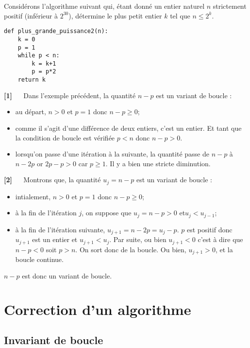 Considérons l’algorithme suivant qui, étant donné un entier naturel $n$ strictement positif (inférieur à $2^{30}$), détermine le plus petit entier $k$ tel que $n \leq 2^k$.
\begin{lstlisting}
def plus_grande_puissance2(n):
    k = 0
    p = 1
    while p < n:
        k = k+1
        p = p*2
    return k
\end{lstlisting}
\begin{demo}\textbf{[1]} $\quad$
Dans l’exemple précédent, la quantité $n - p$ est un variant de boucle :
\begin{itemize}
\item au départ, $n > 0$ et $p = 1$ donc $n - p \geq 0$;
\item comme il s’agit d’une différence de deux entiers, c’est un entier. Et tant que la condition
de boucle est vérifiée $p < n$ donc $n - p > 0$.
\item lorsqu’on passe d’une itération à la suivante, la quantité passe de $n-p$ à $n-2p$ or $2p-p > 0$
car $p \geq 1$. Il y a bien une stricte diminution.
\end{itemize}
\end{demo}

\begin{demo}\textbf{[2]} $\quad$
Montrons que, la quantité $u_j = n - p$ est un variant de boucle :
\begin{itemize}
\item intialement, $n > 0$ et $p = 1$ donc $n - p \geq 0$;
\item à la fin de l'itération $j$, on suppose que $u_j = n - p >0 $ et$u_j < u_{j-1}$;
\item à la fin de l'itération suivante, $u_{j+1}=n-2p = u_j - p$. $p$ est positif donc $u_{j+1}$ est un entier et $u_{j+1}<u_j$. Par suite, ou bien $u_{j+1}<0$ c'est à dire que $n-p<0$ soit $p>n$. On sort donc de la boucle. Ou bien, $u_{j+1}>0$, et la boucle continue.
\end{itemize}
$n - p$ est donc un variant de boucle.
\end{demo}

\section{Correction d'un algorithme}
\subsection{Invariant de boucle}


